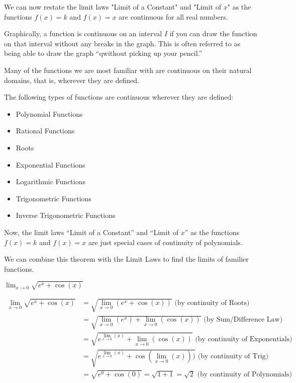 \documentclass{ximera}
\begin{document}
We can now restate the limit laws "Limit of a Constant" and "Limit of $x$" as the functions $f(x)=k$ and  $f(x)=x$ are continuous for all real numbers.

Graphically, a function is continuous on an interval $I$ if you can
draw the function on that interval without any breaks in the graph.
This is often referred to as being able to draw the graph ``qwithout
picking up your pencil.''

Many of the functions we are most familiar with are continuous on
their natural domains, that is, wherever they are defined.

\begin{theorem}\label{theorem:continuity}
The following types of functions are continuous wherever they are defined:
\begin{itemize}
\item Polynomial Functions
\item Rational Functions
\item Roots
\item Exponential Functions
\item Logarithmic Functions 
\item Trigonometric Functions
\item Inverse Trigonometric Functions
\end{itemize}
\end{theorem}

Now, the limit laws ``Limit of a Constant'' and ``Limit of $x$'' as
the functions $f(x)=k$ and $f(x)=x$ are just special cases of
continuity of polynomials.

We can combine this theorem with the Limit Laws to find the limits of familier functions.
\begin{example}
$\lim_{x \to 0} \sqrt{e^{x}+\cos(x)}$
\begin{explanation}
\begin{align*}
  \lim_{x \to 0} \sqrt{e^{x}+\cos(x)} &= 
  \sqrt{\lim_{x \to 0} (e^{x}+\cos(x))} \text{\ \ (by continuity of Roots)}\\
  &= \sqrt{\lim_{x \to 0} (e^{x})+\lim_{x \to 0} (\cos(x))} \text{\ \ (by Sum/Difference Law)}\\
  &= \sqrt{e^{\lim_{x \to 0} (x)}+\lim_{x \to 0} (\cos(x))} \text{\ \ (by continuity of Exponentials)}\\
  &= \sqrt{e^{\lim_{x \to 0} (x)}+ \cos(\lim_{x \to 0}(x)))} \text{\ \ (by continuity of Trig)}\\
  &= \sqrt{e^{0}+ \cos(0)}=\sqrt{1+1}=\sqrt{2} \text{\ \ (by continuity of Polynomials)}
\end{align*}
\end{explanation}
\end{example}
\end{document}

